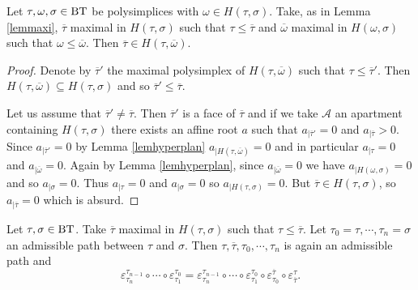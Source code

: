 \documentclass[a4paper,10pt]{amsart}
\begin{document}
\begin{Lem}
\label{lemenveloppemaximal}
Let $\tau,\omega,\sigma \in \bt$ be polysimplices with $\omega \in H(\tau,\sigma)$. Take, as in Lemma \ref{lemmaxi}, $\overline{\tau}$ maximal in $H(\tau,\sigma)$ such that $\tau \leq \overline{\tau}$ and $\overline{\omega}$ maximal in $H(\omega,\sigma)$ such that $\omega \leq \overline{\omega}$. Then $\overline{\tau} \in H(\tau,\overline{\omega})$.
\end{Lem}

\begin{proof}
Denote by $\overline{\tau}'$ the maximal polysimplex of $H(\tau,\overline{\omega})$ such that $\tau \leq \overline{\tau}'$. Then $H(\tau,\overline{\omega}) \subseteq H(\tau,\sigma)$ and so $\overline{\tau}' \leq \overline{\tau}$.

Let us assume that $\overline{\tau}' \neq \overline{\tau}$. Then $\overline{\tau}'$ is a face of $\overline{\tau}$ and if we take $\mathcal{A}$ an apartment containing $H(\tau,\sigma)$ there exists an affine root $a$ such that $a_{|\overline{\tau}'}=0$ and $a_{|\overline{\tau}}>0$. Since $a_{|\overline{\tau}'}=0$ by Lemma \ref{lemhyperplan} $a_{|H(\tau,\overline{\omega})}=0$ and in particular $a_{|\tau}=0$ and $a_{|\overline{\omega}}=0$. Again by Lemma \ref{lemhyperplan}, since $a_{|\overline{\omega}}=0$ we have $a_{|H(\omega,\sigma)}=0$ and so $a_{|\sigma}=0$. Thus $a_{|\tau}=0$ and $a_{|\sigma}=0$ so $a_{|H(\tau,\sigma)}=0$. But $\overline{\tau} \in H(\tau,\sigma)$, so $a_{|\overline{\tau}}=0$ which is absurd.
\end{proof}

\begin{Lem}
\label{lemfactorisationdebut}
Let $\tau,\sigma \in \bt$. Take $\overline{\tau}$ maximal in $H(\tau,\sigma)$ such that $\tau \leq \overline{\tau}$. Let $\tau_{0}=\tau, \cdots, \tau_{n}=\sigma$ an admissible path between $\tau$ and $\sigma$. Then $\tau, \overline{\tau}, \tau_{0}, \cdots, \tau_{n}$ is again an admissible path and
\[\varepsilon^{\tau_{n-1}}_{\tau_{n}} \circ \cdots \circ \varepsilon_{\tau_{1}}^{\tau_{0}}=\varepsilon^{\tau_{n-1}}_{\tau_{n}} \circ \cdots \circ \varepsilon_{\tau_{1}}^{\tau_{0}} \circ \varepsilon_{\tau_{0}}^{\overline{\tau}} \circ \varepsilon_{\overline{\tau}}^{\tau}.\]
\end{Lem}
\end{document}

